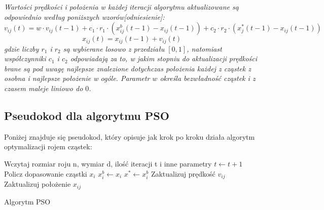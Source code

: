 \textit{Wartości prędkości i położenia w każdej iteracji algorytmu aktualizowane są odpowiednio według poniższych wzorów[odniesienie]:}
\newline
\begin{equation}
v_{ij}(t)=w \cdot v_{ij}(t-1)+c_1\cdot r_1 \cdot (x_{ij}^b(t-1)-x_{ij}(t-1))+c_2 \cdot r_2 \cdot (x_j^*(t-1)-x_{ij}(t-1))
\end{equation}
\newline
\begin{equation}
x_{ij}(t)=x_{ij}(t-1)+v_{ij}(t)
\end{equation}
\newline
\textit{gdzie liczby $r_1$ i $r_2$ są wybierane losowo z przedziału $[0,1]$, natomiast współczynniki $c_1$ i $c_2$ odpowiadają za to, w jakim stopniu do aktualizacji prędkości brane są pod uwagę najlepsze znalezione dotychczas położenia każdej z cząstek z osobna i najlepsze położenie w ogóle. Parametr $w$ określa bezwładność cząstek i z czasem maleje liniowo do $0$.}

\subsection{Pseudokod dla algorytmu PSO}
Poniżej znajduje się pseudokod, który opisuje jak krok po kroku działa algorytm optymalizacji rojem cząstek:
\newpage
\begin{algorithm}[h]
	Wczytaj rozmiar roju n, wymiar d, ilość iteracji t i inne parametry\;
 	{
 		$t\leftarrow t+1$\;
  		{
  			Policz dopasowanie cząstki $x_i$\;
  			{
  				$x_i^b \leftarrow x_i$
  			}
  			{
  				$x^* \leftarrow x_i^b$
  			}
  		}
  		{
  			{
  				Zaktualizuj prędkość $v_{ij}$\;
  				Zaktualizuj położenie $x_{ij}$\;
  			}
  		}
 	}
 	\caption{Algorytm PSO}
\end{algorithm}

